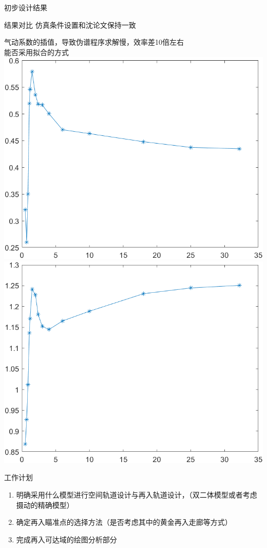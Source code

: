 \documentclass[11pt]{ctexbeamer}
\begin{document}
\begin{frame}{初步设计结果}
	\begin{block}{结果对比}
		仿真条件设置和沈论文保持一致

		
	\end{block}
	气动系数的插值，导致伪谱程序求解慢，效率差10倍左右\\
	能否采用拟合的方式\\
	
	\includegraphics[height=.4\textheight]{Ma_Cl.png}
	\includegraphics[height=.4\textheight]{Ma_Cd.png}

\end{frame}

\begin{frame}{工作计划}
	\begin{block}{}
		\begin{enumerate}
			\item 明确采用什么模型进行空间轨道设计与再入轨道设计，（双二体模型或者考虑摄动的精确模型）
			\item 确定再入瞄准点的选择方法（是否考虑其中的黄金再入走廊等方式）
			\item 完成再入可达域的绘图分析部分
		\end{enumerate}
	\end{block}
\end{frame}
\end{document}
